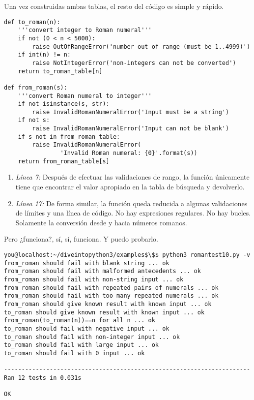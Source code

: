 Una vez construidas ambas tablas, el resto del código es simple y rápido.

\noindent\begin{minipage}{\textwidth}
\begin{lstlisting}[mathescape=True]
def to_roman(n):
    '''convert integer to Roman numeral'''
    if not (0 < n < 5000):
        raise OutOfRangeError('number out of range (must be 1..4999)')
    if int(n) != n:
        raise NotIntegerError('non-integers can not be converted')
    return to_roman_table[n]

def from_roman(s):
    '''convert Roman numeral to integer'''
    if not isinstance(s, str):
        raise InvalidRomanNumeralError('Input must be a string')
    if not s:
        raise InvalidRomanNumeralError('Input can not be blank')
    if s not in from_roman_table:
        raise InvalidRomanNumeralError(
                'Invalid Roman numeral: {0}'.format(s))
    return from_roman_table[s]
\end{lstlisting}
\end{minipage}

\begin{enumerate}

\item \emph{Línea 7:} Después de efectuar las validaciones de rango, la función  únicamente tiene que encontrar el valor apropiado en la tabla de búsqueda y devolverlo.

\item \emph{Línea 17:} De forma similar, la función  queda reducida a algunas validaciones de límites y una línea de código. No hay expresiones regulares. No hay bucles. Solamente la conversión desde y hacia números romanos.

\end{enumerate}

Pero ¿funciona?, sí, sí, funciona. Y puedo probarlo.

\noindent\begin{minipage}{\textwidth}
\begin{lstlisting}[mathescape=True]
you@localhost:~/diveintopython3/examples$\$$ python3 romantest10.py -v
from_roman should fail with blank string ... ok
from_roman should fail with malformed antecedents ... ok
from_roman should fail with non-string input ... ok
from_roman should fail with repeated pairs of numerals ... ok
from_roman should fail with too many repeated numerals ... ok
from_roman should give known result with known input ... ok
to_roman should give known result with known input ... ok
from_roman(to_roman(n))==n for all n ... ok
to_roman should fail with negative input ... ok
to_roman should fail with non-integer input ... ok
to_roman should fail with large input ... ok
to_roman should fail with 0 input ... ok

----------------------------------------------------------------------
Ran 12 tests in 0.031s

OK
\end{lstlisting}
\end{minipage}

